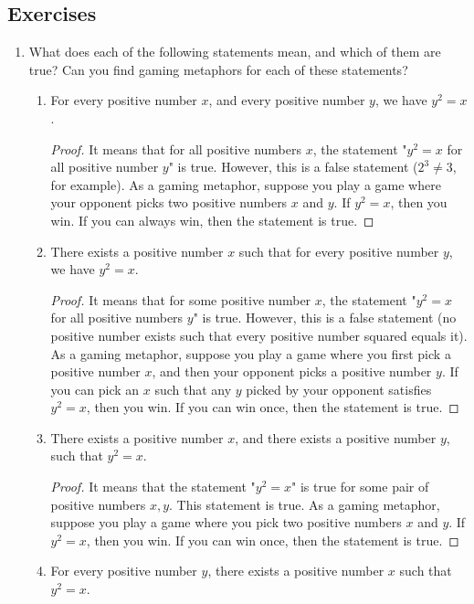 \documentclass[../main.tex]{subfiles}
\begin{document}
\subsection*{Exercises}
\begin{enumerate}[ref={\thesection.\arabic*}]
    \item \label{exr:A.5.1}What does each of the following statements mean, and which of them are true? Can you find gaming metaphors for each of these statements?
    \begin{enumerate}
        \item For every positive number $x$, and every positive number $y$, we have $y^2=x$.
        \begin{proof}
            It means that for all positive numbers $x$, the statement "$y^2=x$ for all positive number $y$" is true. However, this is a false statement ($2^3\neq 3$, for example). As a gaming metaphor, suppose you play a game where your opponent picks two positive numbers $x$ and $y$. If $y^2=x$, then you win. If you can always win, then the statement is true.
        \end{proof}
        \item There exists a positive number $x$ such that for every positive number $y$, we have $y^2=x$.
        \begin{proof}
            It means that for some positive number $x$, the statement "$y^2=x$ for all positive numbers $y$" is true. However, this is a false statement (no positive number exists such that every positive number squared equals it). As a gaming metaphor, suppose you play a game where you first pick a positive number $x$, and then your opponent picks a positive number $y$. If you can pick an $x$ such that any $y$ picked by your opponent satisfies $y^2=x$, then you win. If you can win once, then the statement is true.
        \end{proof}
        \item There exists a positive number $x$, and there exists a positive number $y$, such that $y^2=x$.
        \begin{proof}
            It means that the statement "$y^2=x$" is true for some pair of positive numbers $x,y$. This statement is true. As a gaming metaphor, suppose you play a game where you pick two positive numbers $x$ and $y$. If $y^2=x$, then you win. If you can win once, then the statement is true.
        \end{proof}
        \item For every positive number $y$, there exists a positive number $x$ such that $y^2=x$.

\end{enumerate}
\end{enumerate}
\end{document}
